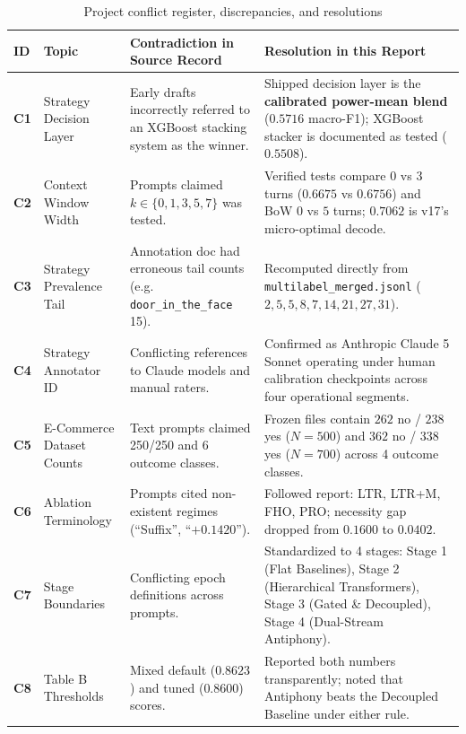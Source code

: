 \begin{table}[htbp]
  \centering
  \small
  \caption{Project conflict register, discrepancies, and resolutions}
  \label{tab:app-conflicts}
  \begin{tabularx}{\textwidth}{lp{}p{}Y}
    \toprule
    \textbf{ID} & \textbf{Topic} & \textbf{Contradiction in Source Record} & \textbf{Resolution in this Report} \\
    \midrule
    \textbf{C1} & Strategy Decision Layer & Early drafts incorrectly referred to an XGBoost stacking system as the winner. & Shipped decision layer is the \textbf{calibrated power-mean blend} ($0.5716$ macro-F1); XGBoost stacker is documented as tested ($0.5508$). \\
    \midrule
    \textbf{C2} & Context Window Width & Prompts claimed $k \in \{0,1,3,5,7\}$ was tested. & Verified tests compare $0$ vs $3$ turns ($0.6675$ vs $0.6756$) and BoW $0$ vs $5$ turns; $0.7062$ is v17's micro-optimal decode. \\
    \midrule
    \textbf{C3} & Strategy Prevalence Tail & Annotation doc had erroneous tail counts (e.g. \texttt{door\_in\_the\_face} 15). & Recomputed directly from \texttt{multilabel\_merged.jsonl} ($2, 5, 5, 8, 7, 14, 21, 27, 31$). \\
    \midrule
    \textbf{C4} & Strategy Annotator ID & Conflicting references to Claude models and manual raters. & Confirmed as Anthropic Claude 5 Sonnet operating under human calibration checkpoints across four operational segments. \\
    \midrule
    \textbf{C5} & E-Commerce Dataset Counts & Text prompts claimed 250/250 and 6 outcome classes. & Frozen files contain $262$ no / $238$ yes ($N=500$) and $362$ no / $338$ yes ($N=700$) across 4 outcome classes. \\
    \midrule
    \textbf{C6} & Ablation Terminology & Prompts cited non-existent regimes (``Suffix'', ``$+0.1420$''). & Followed report: LTR, LTR+M, FHO, PRO; necessity gap dropped from $0.1600$ to $0.0402$. \\
    \midrule
    \textbf{C7} & Stage Boundaries & Conflicting epoch definitions across prompts. & Standardized to 4 stages: Stage 1 (Flat Baselines), Stage 2 (Hierarchical Transformers), Stage 3 (Gated \& Decoupled), Stage 4 (Dual-Stream Antiphony). \\
    \midrule
    \textbf{C8} & Table B Thresholds & Mixed default ($0.8623$) and tuned ($0.8600$) scores. & Reported both numbers transparently; noted that Antiphony beats the Decoupled Baseline under either rule. \\

\end{tabularx}
\end{table}
